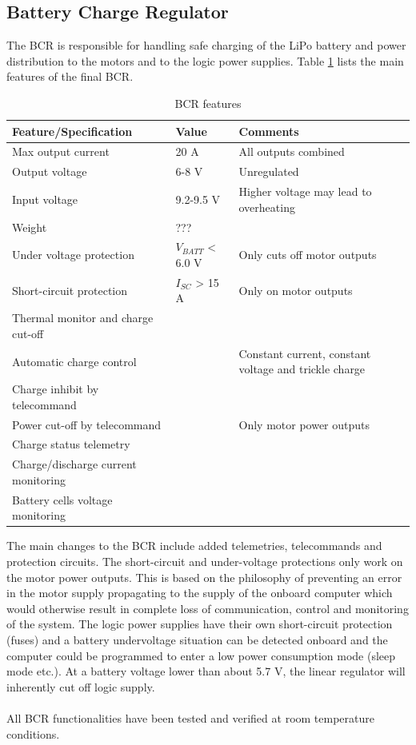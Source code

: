 \subsection{Battery Charge Regulator}
\label{sec:changes_BCR}
%
The \ac{BCR} is responsible for handling safe charging of the \ac{LiPo} battery and power distribution to the motors and to the logic power supplies. Table \ref{tab:BCR_features} lists the main features of the final \ac{BCR}.
%
\begin{table}[H]
\centering
\caption{\ac{BCR} features}
\label{tab:BCR_features}
\begin{tabular}{p{}p{}p{}}
\hline
\textbf{Feature/Specification} & \textbf{Value} & \textbf{Comments}\\
\hline
Max output current & 20 A & All outputs combined \\
Output voltage & 6-8 V & Unregulated \\
Input voltage & 9.2-9.5 V & Higher voltage may lead to overheating\\
Weight & ??? & \\
Under voltage protection & $V_{BATT}$ < 6.0 V & Only cuts off motor outputs \\
Short-circuit protection & $I_{SC}$ > 15 A & Only on motor outputs \\
Thermal monitor and charge cut-off & & \\
Automatic charge control &  & Constant current, constant voltage and trickle charge\\
Charge inhibit by telecommand & & \\
Power cut-off by telecommand & & Only motor power outputs\\
Charge status telemetry & &\\
Charge/discharge current monitoring & & \\
Battery cells voltage monitoring & & \\
\hline
\end{tabular}
\end{table} 
%
\noindent
The main changes to the \ac{BCR} include added telemetries, telecommands and protection circuits. The short-circuit and under-voltage protections only work on the motor power outputs. This is based on the philosophy of preventing an error in the motor supply propagating to the supply of the onboard computer which would otherwise result in complete loss of communication, control and monitoring of the system. The logic power supplies have their own short-circuit protection (fuses) and a battery undervoltage situation can be detected onboard and the computer could be programmed to enter a low power consumption mode (sleep mode etc.). At a battery voltage lower than about 5.7 V, the linear regulator will inherently cut off logic supply.\\\\
%
All \ac{BCR} functionalities have been tested and verified at room temperature conditions.
%
%
